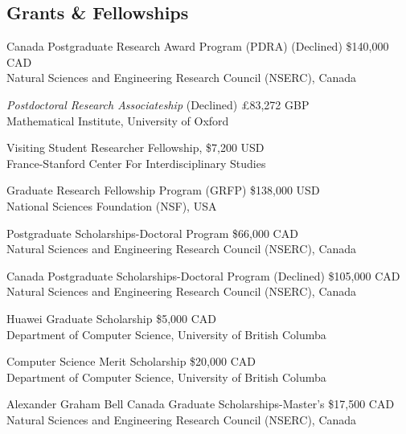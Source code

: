 \documentclass[11pt, a4paper]{article}
\newcommand{\mleftsize}{4.75em}
\begin{document}
\subsection{Grants \& Fellowships}
\begin{description}[leftmargin=\mleftsize,style=nextline,font=\normalfont\space]
    \item[2026]
          Canada Postgraduate Research Award Program (PDRA)
          \hfill (Declined) \$140,000 CAD\\
          Natural Sciences and Engineering Research Council (NSERC), Canada
    \item[2026]
          \textit{Postdoctoral Research Associateship}
          \hfill (Declined) \pounds83,272 GBP\\
          Mathematical Institute, University of Oxford
    \item[2024] Visiting Student Researcher Fellowship, \hfill \$7,200 USD\\
          France-Stanford Center For Interdisciplinary Studies
    \item[2020] Graduate Research Fellowship Program (GRFP) \hfill \$138,000 USD\\
          National Sciences Foundation (NSF), USA
    \item[2020] Postgraduate Scholarships-Doctoral Program \hfill \$66,000 CAD\\
          Natural Sciences and Engineering Research Council (NSERC), Canada
    \item[2020] Canada Postgraduate Scholarships-Doctoral Program \hfill (Declined) \$105,000 CAD\\
          Natural Sciences and Engineering Research Council (NSERC), Canada
    \item[2019] Huawei Graduate Scholarship \hfill \$5,000 CAD\\
          Department of Computer Science, University of British Columba
    \item[2018] Computer Science Merit Scholarship \hfill \$20,000 CAD\\
          Department of Computer Science, University of British Columba
    \item[2018] Alexander Graham Bell Canada Graduate Scholarships-Master's \hfill \$17,500 CAD\\
          Natural Sciences and Engineering Research Council (NSERC), Canada
\end{description}
\end{document}
